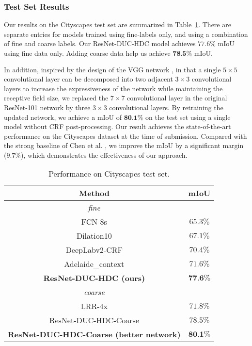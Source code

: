 \documentclass[10pt,twocolumn,letterpaper]{article}
\begin{document}
\subsubsection{Test Set Results}
Our results on the Cityscapes test set are summarized in Table~\ref{table_4}. There are separate entries for models trained using fine-labels only, and using a combination of fine and coarse labels. Our ResNet-DUC-HDC model achieves $77.6\%$ mIoU using fine data only. Adding coarse data help us achieve $\textbf{78.5\%}$ mIoU.

In addition, inspired by the design of the VGG network \cite{simonyan2014very}, in that a single $5\times5$ convolutional layer can be decomposed into two adjacent $3\times3$ convolutional layers to increase the expressiveness of the network while maintaining the receptive field size, we replaced the $7\times 7$ convolutional layer in the original ResNet-101 network by three $3\times3$ convolutional layers. By retraining the updated network, we achieve a mIoU of $\textbf{80.1\%}$ on the test set using a single model without CRF post-processing. Our result achieves the state-of-the-art performance on the Cityscapes dataset at the time of submission. Compared with the strong baseline of Chen et al. \cite{chen2016deeplab}, we improve the mIoU by a significant margin ($9.7\%$), which demonstrates the effectiveness of our approach. 

\begin{table}[ht]
\begin{center}
\begin{tabular}{c|c} \toprule[1.5pt]{Method}             &{mIoU}\\ \midrule
    \textit{fine} & \\
   FCN 8s \cite{long2015fully}           & $65.3\%$\\
   Dilation10 \cite{yu2015multi}         & $67.1\%$ \\ 
   DeepLabv2-CRF \cite{chen2016deeplab}         & $70.4\%$ \\ 
   Adelaide\_context \cite{lin2015efficient}         & $71.6\%$ \\
   \textbf{ResNet-DUC-HDC (ours)}         & $\textbf{77.6\%}$ \\    \midrule[1.25pt]
   \textit{coarse} & \\ 
   LRR-4x \cite{ghiasi2016laplacian}           & $71.8\%$ \\
   {ResNet-DUC-HDC-Coarse }       & ${78.5\%}$\\
   \textbf{ResNet-DUC-HDC-Coarse (better network)}       & $\textbf{80.1\%}$\\ \bottomrule[1.5pt]

\end{tabular}
\vspace{2pt}
\caption{Performance on Cityscapes test set.}
\label{table_4} 
\vspace{-15pt}
\end{center}
\end{table}
\end{document}
